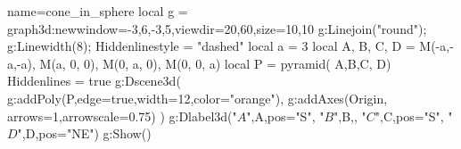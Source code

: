 \documentclass[12pt]{standalone}
\begin{document}
\begin{luadraw}{name=cone_in_sphere}
local g = graph3d:new{window={-3,6,-3,5},viewdir={20,60},size={10,10}}
g:Linejoin("round"); g:Linewidth(8); Hiddenlinestyle = "dashed"
local a = 3
local A, B, C, D = M(-a,-a,-a),   M(a, 0, 0),   M(0, a, 0),   M(0, 0, a) 
local P = pyramid( {A,B,C}, D)
Hiddenlines = true 
g:Dscene3d(
g:addPoly(P,{edge=true,width=12,color="orange"}),
g:addAxes(Origin, {arrows=1,arrowscale=0.75})
)
g:Dlabel3d("$A$",A,{pos="S"}, "$B$",B,{}, "$C$",C,{pos="S"}, "$D$",D,{pos="NE"})
g:Show()
\end{luadraw}
\end{document}
